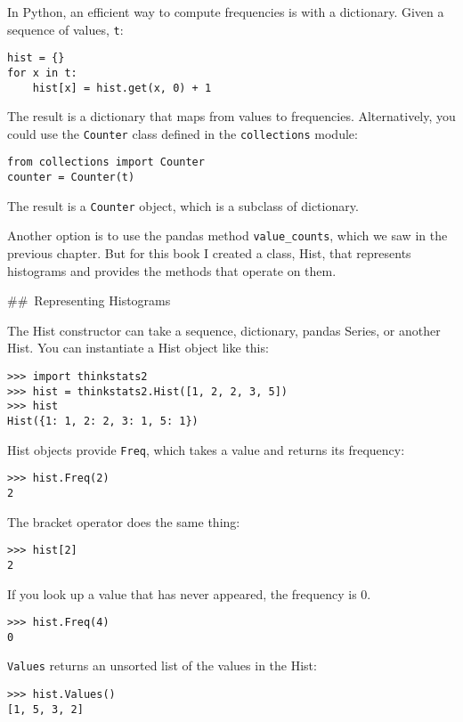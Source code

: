 \documentclass[]{book}
\begin{document}
In Python, an efficient way to compute
frequencies is with a dictionary. Given a sequence of values, \texttt{t}:

\begin{verbatim}
hist = {}
for x in t:
    hist[x] = hist.get(x, 0) + 1
\end{verbatim}

The result is a dictionary that maps from
values to frequencies. Alternatively, you could use the \texttt{Counter} class defined in the \texttt{collections} module:

\begin{verbatim}
from collections import Counter
counter = Counter(t)
\end{verbatim}

The result is a \texttt{Counter} object, which is a subclass
of dictionary.

Another option is to use the pandas
method \texttt{value\_counts}, which we saw in the previous chapter. But for
this book I created a class, Hist, that represents histograms and
provides the methods that operate on them.

\#\#~Representing Histograms

The Hist constructor can take a sequence,
dictionary, pandas Series, or another Hist. You can instantiate a Hist
object like this:

\begin{verbatim}
>>> import thinkstats2
>>> hist = thinkstats2.Hist([1, 2, 2, 3, 5])
>>> hist
Hist({1: 1, 2: 2, 3: 1, 5: 1})
\end{verbatim}

Hist objects provide \texttt{Freq}, which takes a value and
returns its frequency:

\begin{verbatim}
>>> hist.Freq(2)
2
\end{verbatim}

The bracket operator does the same thing:

\begin{verbatim}
>>> hist[2]
2
\end{verbatim}

If you look up a value that has never
appeared, the frequency is 0.

\begin{verbatim}
>>> hist.Freq(4)
0
\end{verbatim}

\texttt{Values} returns an unsorted list of
the values in the Hist:

\begin{verbatim}
>>> hist.Values()
[1, 5, 3, 2]
\end{verbatim}
\end{document}
